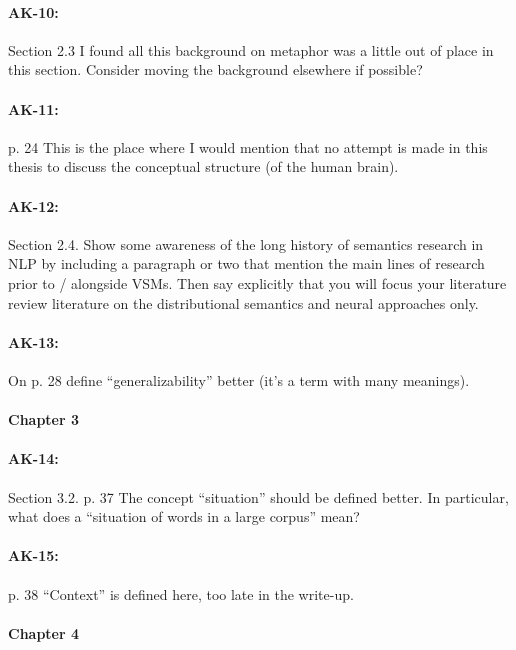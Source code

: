 \documentclass[11pt,a4paper]{article}
\begin{document}
\paragraph{AK-10:} Section 2.3 I found all this background on metaphor was a little out of place in this section. Consider moving the background elsewhere if possible?

\paragraph{AK-11:} p. 24 This is the place where I would mention that no attempt is made in this thesis to discuss the conceptual structure (of the human brain).

\paragraph{AK-12:} Section 2.4. Show some awareness of the long history of semantics research in NLP by including a paragraph or two that mention the main lines of research prior to / alongside VSMs. Then say explicitly that you will focus your literature review literature on the distributional semantics and neural approaches only.

\paragraph{AK-13:} On p. 28 define “generalizability” better (it’s a term with many meanings).

\paragraph{Chapter 3}

\paragraph{AK-14:} Section 3.2. p. 37 The concept “situation” should be defined better. In particular, what does a “situation of words in a large corpus” mean?

\paragraph{AK-15:} p. 38 “Context” is defined here, too late in the write-up.

\paragraph{Chapter 4}
\end{document}
